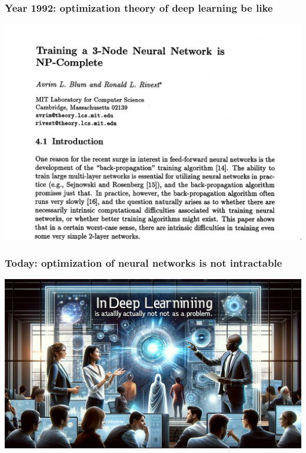\documentclass{beamer}   	%
\theoremstyle{definition}
\begin{document}
\begin{frame}
\frametitle{Year 1992: optimization theory of deep learning be like}
\includegraphics[width=\linewidth]{train_nn_is_np_complete.png}
\end{frame}

\begin{frame}
\frametitle{Today: optimization of neural networks is not intractable}
\includegraphics[width=\linewidth]{nn_is_not_a_problem.png}
\end{frame}
\end{document}
